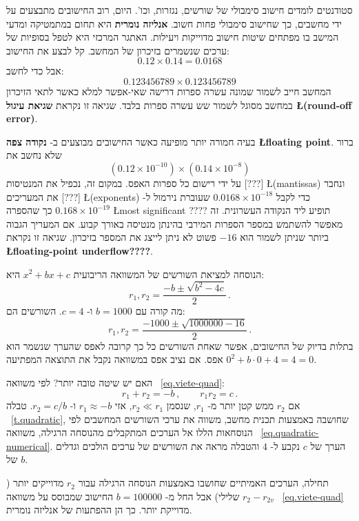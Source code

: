סטודנטים לומדים חישוב סימבולי של שורשים, נגזרות, וכו'. היום, רוב החישובים מתבצעים על ידי מחשבים, כך שחישוב סימבולי פחות חשוב. 
\textbf{אנליזה נומרית}
היא תחום במתמטיקה ומדעי המישב בו מפתחים שיטות חישוב מדוייקות ויעילות. האתגר המרכזי היא לטפל בסופיות של ערכים שנשמרים בזיכרון של המחשב. קל לבצע את החישוב:
\[0.12\times 0.14=0.0168\]
אבל כדי לחשב:
\[0.123456789\times 0.123456789\]
המחשב חייב לשמור שמונה עשרה ספרות דרישה שאי-אפשר למלא כאשר לתאי הזיכרון במחשב מסוגל לשמור שש עשרה ספרות בלבד. שגיאה זו נקראת 
\textbf{שגיאת עיגול \L{(round-off error)}}.

בעיה חמורה יותר מופיעה כאשר החישובים מבוצעים ב-%
\textbf{נקודה צפה \L{\small floating point}}.
ברור שלא נחשב את
\[(0.12\times 10^{-10})\times (0.14\times 10^{-8})\]
על ידי רישום כל ספרות האפס. במקום זה, נכפיל את המנטיסות [???]
\L{\small (mantissas)}
ונחבר את המעריכים [???] 
\L{\small (exponents)}
כדי לקבל
$0.0168\times 10^{-18}$
שעוברת נירמול ל-%
$0.168\times 10^{-19}$
כך שהספרה 
\L{\small most significant ????}
תופיע ליד הנקודה העשרונית. זה מאפשר להשתמש במספר הספרות המירבי בהינתן מנטיסה באורך קבוע. אם המעריך הגבוה ביותר שניתן לשמור הוא 
$-16$
פשוט לא ניתן לייצג את המספר בזיכרון. שגיאה זו נקראת 
\textbf{\L{floating-point underflow????}}.

הנוסחה למציאת השורשים של המשוואה הריבועית
$x^2+bx+c$ 
היא:
\begin{equation}
r_1, r_2 = \frac{-b\pm\sqrt{b^2-4c}}{2}\,.\label{eq.quadratic-numerical}
\end{equation}
מה קורה עם
$b=1000$
ו-%
$c=4$.
השורשים הם:
\[
r_1, r_2 = \frac{-1000\pm\sqrt{1000000-16}}{2}\,.
\]
בתלות בדיוק של החישובים, אפשר שאחת השורשים כל כך קרובה לאפס שהערך שנשמר הוא אפס. אם נציב אפס במשוואה נקבל את התוצאה המפתיעה
$0^2+b\cdot 0 +4= 4= 0$.

האם יש שיטה טובה יותר? לפי משוואה%
~\ref{eq.viete-quad}:
\[
r_1+r_2 = -b\,,\quad\quad r_1r_2=c\,.
\]
אם
$r_2$
ממש קטן יותר מ-%
$r_1$,
שנסמן
$r_2\ll r_1$,
אזי
$r_1\approx -b$
ו-%
$r_2=c/b$.
טבלה%
~\ref{t.quadratic},
שחושבה באמצעות תכנית מחשב, משווה את ערכי השורשים המחשבים לפי הנוסחאות הללו אל הערכים המתקבלים מהנוסחה הרגילה, משוואה%
~\ref{eq.quadratic-numerical}.
הערך של
$c$
נקבע ל-%
$4$
והטבלה מראה את השורשים של ערכים הולכים וגדלים של
$b$.

תחילה, הערכים האמיתיים שחושבו באמצעות הנוסחה הרגילה עבור
$r_2$
מדוייקים יותר
($r_2-r_{2v}$ שלילי)
אבל החל מ-%
$b=100000$
החישוב שמבוסס על משוואה%
~\ref{eq.viete-quad}
מדוייקת יותר. כך הן ההפתעות של אנליזה נומרית.


